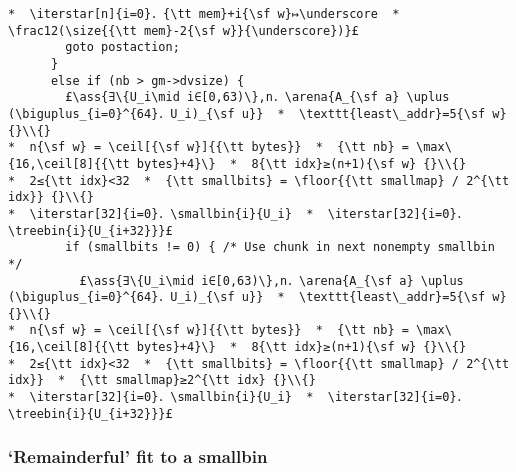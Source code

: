 \documentclass[10pt,twoside]{report}
\makeatletter
\newcommand{\ml}[2][t]{\mbox{\mdseries\begin{tabular}[#1]{@{}L@{}}#2\end{tabular}}}
\newcommand{\ass}[1]{\ensuremath{{\color{blue}\left\{\ml[c]{#1}\right\}}}}
\renewcommand{\floor}[2][]{\left\lfloor{#2}\right\rfloor_{#1}}
\renewcommand{\ceil}[2][]{\left\lceil{#2}\right\rceil_{#1}}
\newcommand{\iterstar}[2][]{\text{\LARGE $*$}^{#1}_{#2}}
\makeatother
\begin{document}
\begin{lstlisting}
*  \iterstar[n]{i=0}．{\tt mem}+i{\sf w}↦\underscore  *  \frac12(\size{{\tt mem}-2{\sf w}}{\underscore})}£
        goto postaction;
      }
      else if (nb > gm->dvsize) {
        £\ass{∃\{U_i\mid i∈[0,63)\},n．\arena{A_{\sf a} \uplus (\biguplus_{i=0}^{64}．U_i)_{\sf u}}  *  \texttt{least\_addr}=5{\sf w} {}\\{}
*  n{\sf w} = \ceil[{\sf w}]{{\tt bytes}}  *  {\tt nb} = \max\{16,\ceil[8]{{\tt bytes}+4}\}  *  8{\tt idx}≥(n+1){\sf w} {}\\{}
*  2≤{\tt idx}<32  *  {\tt smallbits} = \floor{{\tt smallmap} / 2^{\tt idx}} {}\\{}
*  \iterstar[32]{i=0}．\smallbin{i}{U_i}  *  \iterstar[32]{i=0}．\treebin{i}{U_{i+32}}}£
        if (smallbits != 0) { /* Use chunk in next nonempty smallbin */
          £\ass{∃\{U_i\mid i∈[0,63)\},n．\arena{A_{\sf a} \uplus (\biguplus_{i=0}^{64}．U_i)_{\sf u}}  *  \texttt{least\_addr}=5{\sf w} {}\\{}
*  n{\sf w} = \ceil[{\sf w}]{{\tt bytes}}  *  {\tt nb} = \max\{16,\ceil[8]{{\tt bytes}+4}\}  *  8{\tt idx}≥(n+1){\sf w} {}\\{}
*  2≤{\tt idx}<32  *  {\tt smallbits} = \floor{{\tt smallmap} / 2^{\tt idx}}  *  {\tt smallmap}≥2^{\tt idx} {}\\{}
*  \iterstar[32]{i=0}．\smallbin{i}{U_i}  *  \iterstar[32]{i=0}．\treebin{i}{U_{i+32}}}£
\end{lstlisting}

\subsubsection*{`Remainderful' fit to a smallbin}\label{sect:remainderful_fit_to_a_smallbin}
\end{document}
